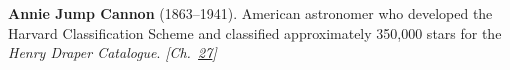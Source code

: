 \textbf{Annie Jump Cannon} (1863–1941). American astronomer who developed the Harvard Classification Scheme and classified approximately 350,000 stars for the \emph{Henry Draper Catalogue}. \emph{[Ch.~\hyperref[ch:planetaryskycolors]{27}]}

